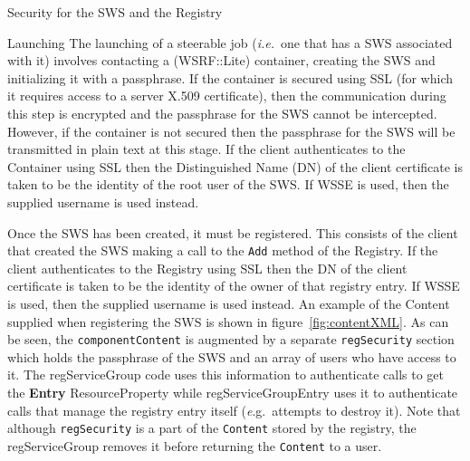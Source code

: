 \documentclass[a4paper]{article}
\begin{document}
\begin{section}{Security for the SWS and the Registry}
\begin{subsection}{Launching}
\label{sec:Launching}
The launching of a steerable job ({\it i.e.}\ one that has a SWS
associated with it) involves contacting a (WSRF::Lite) container,
creating the SWS and initializing it with a passphrase.  If the
container is secured using SSL (for which it requires access to a
server X.509 certificate), then the communication during this step is
encrypted and the passphrase for the SWS cannot be intercepted.
However, if the container is not secured then the passphrase for the
SWS will be transmitted in plain text at this stage.  If the client
authenticates to the Container using SSL then the Distinguished Name
(DN) of the client certificate is taken to be the identity of the root
user of the SWS.  If WSSE is used, then the supplied username is used
instead.

Once the SWS has been created, it must be registered.  This consists
of the client that created the SWS making a call to the \texttt{Add}
method of the Registry.  If the client authenticates to the Registry
using SSL then the DN of the client certificate is taken to be the
identity of the owner of that registry entry.  If WSSE is used, then
the supplied username is used instead.  An example of the Content
supplied when registering the SWS is shown in
figure~\ref{fig:contentXML}.  As can be seen, the
\texttt{componentContent} is augmented by a separate
\texttt{regSecurity} section which holds the passphrase of the SWS and
an array of users who have access to it.  The regServiceGroup code
uses this information to authenticate calls to get the {\bf Entry}
ResourceProperty while regServiceGroupEntry uses it to authenticate
calls that manage the registry entry itself ({\textit e.g.}\ attempts
to destroy it). Note that although \texttt{regSecurity} is a part of
the \texttt{Content} stored by the registry, the regServiceGroup
removes it before returning the \texttt{Content} to a user.


\end{subsection}
\end{section}
\end{document}
